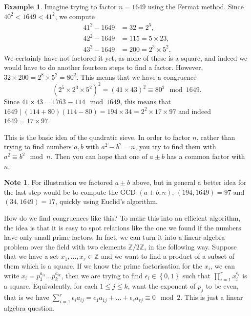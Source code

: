 \documentclass{article}
\newcommand{\Z}{\mathbb{Z}}
\newcommand{\rb}[1]{\left( #1 \right)}
\newcommand{\cb}[1]{\left\{ #1 \right\}}
\theoremstyle{definition}\newtheorem{definition}{Definition}
\theoremstyle{definition}\newtheorem{remark}[definition]{Remark}
\theoremstyle{definition}\newtheorem*{example}{Example}
\theoremstyle{definition}\newtheorem*{note}{Note}
\begin{document}
\begin{example}
Imagine trying to factor $ n = 1649 $ using the Fermat method. Since $ 40^2 < 1649 < 41^2 $, we compute
\begin{align*}
41^2 - 1649 & = 32 = 2^5, \\
42^2 - 1649 & = 115 = 5 \times 23, \\
43^2 - 1649 & = 200 = 2^3 \times 5^2.
\end{align*}
We certainly have not factored it yet, as none of these is a square, and indeed we would have to do another fourteen steps to find a factor. However, $ 32 \times 200 = 2^8 \times 5^2 = 80^2 $. This means that we have a congruence
$$ \rb{2^5 \times 2^3 \times 5^2}^2 = \rb{41 \times 43}^2 \equiv 80^2 \mod 1649. $$
Since $ 41 \times 43 = 1763 \equiv 114 \mod 1649 $, this means that $ 1649 \mid \rb{114 + 80}\rb{114 - 80} = 194 \times 34 = 2^2 \times 17 \times 97 $ and indeed $ 1649 = 17 \times 97 $.
\end{example}

This is the basic idea of the quadratic sieve. In order to factor $ n $, rather than trying to find numbers $ a, b $ with $ a^2 - b^2 = n $, you try to find them with $ a^2 \equiv b^2 \mod n $. Then you can hope that one of $ a \pm b $ has a common factor with $ n $.

\begin{note}
For illustration we factored $ a \pm b $ above, but in general a better idea for the last step would be to compute the GCD $ \rb{a \pm b, n} $, $ \rb{194, 1649} = 97 $ and $ \rb{34, 1649} = 17 $, quickly using Euclid's algorithm.
\end{note}

How do we find congruences like this? To make this into an efficient algorithm, the idea is that it is easy to spot relations like the one we found if the numbers have only small prime factors. In fact, we can turn it into a linear algebra problem over the field with two elements $ \Z / 2\Z $, in the following way. Suppose that we have a set $ x_1, \dots, x_r \in \Z $ and we want to find a product of a subset of them which is a square. If we know the prime factorisation for the $ x_i $, we can write $ x_i = p_1^{a_{i1}} \dots p_k^{a_{ik}} $, then we are trying to find $ \epsilon_i \in \cb{0, 1} $ such that $ \prod_{i = 1}^r x_i^{\epsilon_i} $ is a square. Equivalently, for each $ 1 \le j \le k $, want the exponent of $ p_j $ to be even, that is we have $ \sum_{i = 1}^r \epsilon_ia_{ij} = \epsilon_1a_{1j} + \dots + \epsilon_ra_{rj} \equiv 0 \mod 2 $. This is just a linear algebra question.
\end{document}
